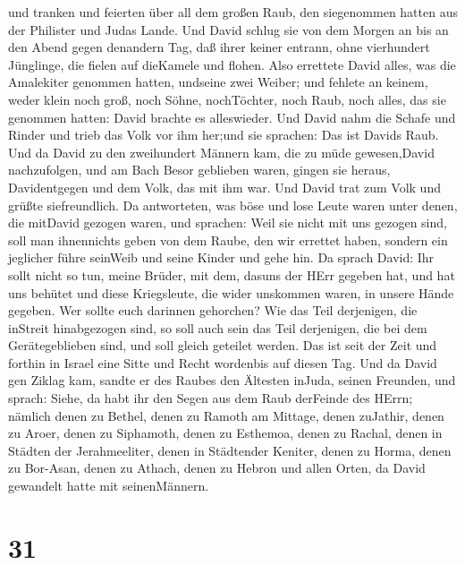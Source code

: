 und tranken und feierten über all dem großen Raub, den siegenommen
hatten aus der Philister und Judas Lande.  Und David schlug
sie von dem Morgen an bis an den Abend gegen denandern Tag, daß ihrer
keiner entrann, ohne vierhundert Jünglinge, die fielen auf dieKamele und
flohen.  Also errettete David alles, was die Amalekiter
genommen hatten, undseine zwei Weiber;  und fehlete an
keinem, weder klein noch groß, noch Söhne, nochTöchter, noch Raub, noch
alles, das sie genommen hatten: David brachte es alleswieder.
 Und David nahm die Schafe und Rinder und trieb das Volk
vor ihm her;und sie sprachen: Das ist Davids Raub.  Und da
David zu den zweihundert Männern kam, die zu müde gewesen,David
nachzufolgen, und am Bach Besor geblieben waren, gingen sie heraus,
Davidentgegen und dem Volk, das mit ihm war. Und David trat zum Volk und
grüßte siefreundlich.  Da antworteten, was böse und lose
Leute waren unter denen, die mitDavid gezogen waren, und sprachen: Weil
sie nicht mit uns gezogen sind, soll man ihnennichts geben von dem
Raube, den wir errettet haben, sondern ein jeglicher führe seinWeib und
seine Kinder und gehe hin.  Da sprach David: Ihr sollt
nicht so tun, meine Brüder, mit dem, dasuns der HErr gegeben hat, und
hat uns behütet und diese Kriegsleute, die wider unskommen waren, in
unsere Hände gegeben.  Wer sollte euch darinnen gehorchen?
Wie das Teil derjenigen, die inStreit hinabgezogen sind, so soll auch
sein das Teil derjenigen, die bei dem Gerätegeblieben sind, und soll
gleich geteilet werden.  Das ist seit der Zeit und forthin
in Israel eine Sitte und Recht wordenbis auf diesen Tag. 
Und da David gen Ziklag kam, sandte er des Raubes den Ältesten inJuda,
seinen Freunden, und sprach: Siehe, da habt ihr den Segen aus dem Raub
derFeinde des HErrn;  nämlich denen zu Bethel, denen zu
Ramoth am Mittage, denen zuJathir,  denen zu Aroer, denen
zu Siphamoth, denen zu Esthemoa,  denen zu Rachal, denen in
Städten der Jerahmeeliter, denen in Städtender Keniter, 
denen zu Horma, denen zu Bor-Asan, denen zu Athach,  denen
zu Hebron und allen Orten, da David gewandelt hatte mit seinenMännern.

\hypertarget{section-30}{%
\section{31}\label{section-30}}

